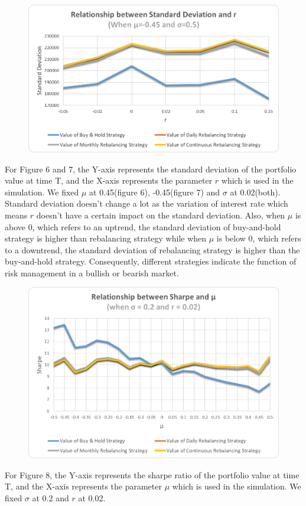 \documentclass[
10pt, %
a4paper, %
oneside, %
headinclude,footinclude, %
BCOR5mm, %
]{scrartcl}
\begin{document}
\begin{figure}[H]
	\centering
	\includegraphics[width=0.7\linewidth]{std_r_-045_050}
	\caption{}
	\label{fig:stdr-045050}
\end{figure}
For Figure 6 and 7, the Y-axis represents the standard deviation of the portfolio value at time T, and the X-axis represents the parameter $r$ which is used in the simulation. We fixed $\mu$ at 0.45(figure 6), -0.45(figure 7) and $\sigma$ at 0.02(both).\\

Standard deviation doesn’t change a lot as the variation of interest rate which means $r$ doesn't have a certain impact on the standard deviation. Also, when $\mu$ is above 0, which refers to an uptrend, the standard deviation of buy-and-hold strategy is higher than rebalancing strategy while when $\mu$ is below 0, which refers to a downtrend, the standard deviation of rebalancing strategy is higher than the buy-and-hold strategy. Consequently, different strategies indicate the function of risk management in a bullish or bearish market. \\

\begin{figure}[H]
	\centering
	\includegraphics[width=0.7\linewidth]{sharpe_mu_020_002}
	\caption{}
	\label{fig:sharpemu020002}
\end{figure}
For Figure 8, the Y-axis represents the sharpe ratio of the portfolio value at time T, and the X-axis represents the parameter $\mu$ which is used in the simulation. We fixed $\sigma$ at 0.2 and $r$ at 0.02.\\
\end{document}
